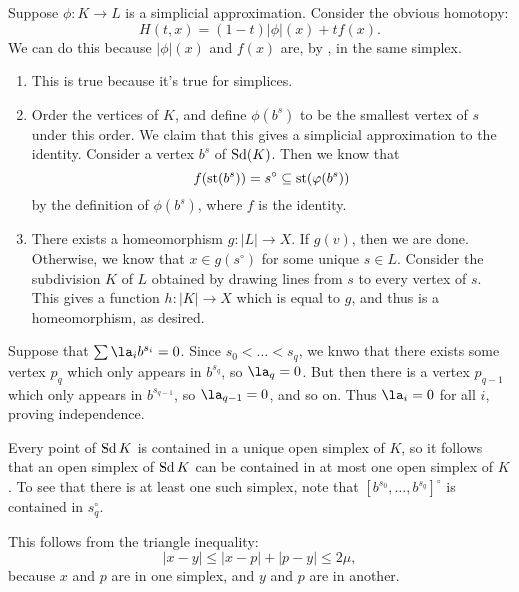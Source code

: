 \documentclass[../../solutions.tex]{subfiles}
\begin{document}
\begin{exercise} \leavevmode
Suppose $\phi:K\to L$ is a simplicial approximation.
Consider the obvious homotopy:
\[H(t,x)=(1-t)|\phi|(x)+tf(x).\]
We can do this because $|\phi|(x)$ and $f(x)$ are, by , in the same simplex.
\end{exercise}

\begin{exercise} \leavevmode
\begin{enumerate}
\item
This is true because it's true for simplices.

\item
Order the vertices of $K$, and define $\phi(b^s)$ to be the smallest vertex of $s$ under this order.
We claim that this gives a simplicial approximation to the identity.
Consider a vertex $b^s$ of $\operatorname{Sd}(K)$.
Then we know that
\[f(\operatorname{st}(b^s))=s^\circ\subseteq\operatorname{st}(\varphi(b^s))\]
by the definition of $\phi(b^s)$, where $f$ is the identity.

\item
There exists a homeomorphism $g:|L|\to X$.
If $g(v)$, then we are done.
Otherwise, we know that $x\in g(s^\circ)$ for some unique $s\in L$.
Consider the subdivision $K$ of $L$ obtained by drawing lines from $s$ to every vertex of $s$.
This gives a function $h:|K|\to X$ which is equal to $g$, and thus is a homeomorphism, as desired.
\end{enumerate}
\end{exercise}

\begin{exercise} \leavevmode
Suppose that $\sum\la_ib^{s_i}=0$.
Since $s_0<\dots<s_q$, we knwo that there exists some vertex $p_q$ which only appears in $b^{s_q}$, so $\la_q=0$.
But then there is a vertex $p_{q-1}$ which only appears in $b^{s_{q-1}}$, so $\la_{q-1}=0$, and so on.
Thus $\la_i=0$ for all $i$, proving independence.
\end{exercise}

\begin{exercise} \leavevmode
Every point of $\operatorname{Sd} K$ is contained in a unique open simplex of $K$, so it follows that an open simplex of $\operatorname{Sd} K$ can be contained in at most one open simplex of $K$.
To see that there is at least one such simplex, note that $[b^{s_0},\dots,b^{s_q}]^\circ$ is contained in $s_q^\circ$.
\end{exercise}

\begin{exercise} \leavevmode
This follows from the triangle inequality:
\[|x-y|\le|x-p|+|p-y|\le2\mu,\]
because $x$ and $p$ are in one simplex, and $y$ and $p$ are in another.
\end{exercise}
\end{document}
